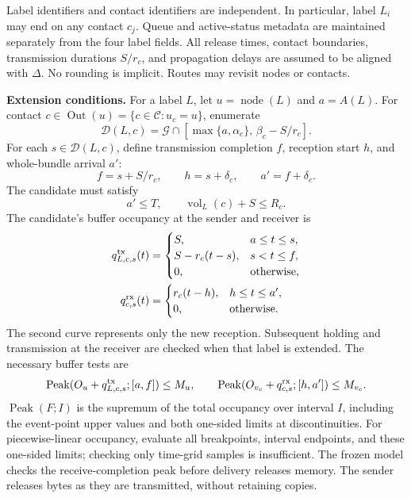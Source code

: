 \documentclass[10pt,a4paper]{article}
\newcommand{\grid}{\mathcal{G}}
\newcommand{\node}{\operatorname{node}}
\newcommand{\vol}{\operatorname{vol}}
\newcommand{\peak}{\operatorname{Peak}}
\newcommand{\out}{\operatorname{Out}}
\begin{document}
\medskip
Label identifiers and contact identifiers are independent. In particular, label $L_i$ may end on any contact $c_j$.
Queue and active-status metadata are maintained separately from the four label fields.
All release times, contact boundaries, transmission durations $S/r_c$, and propagation delays are assumed to be aligned with $\Delta$.
No rounding is implicit. Routes may revisit nodes or contacts.

\newpage
\noindent\textbf{Extension conditions.}
For a label $L$, let $u=\node(L)$ and $a=A(L)$. For contact $c\in\out(u)=\{c\in\mathcal C:u_c=u\}$, enumerate
\begin{equation}
\mathcal D(L,c)=\grid\cap
 [\max\{a,\alpha_c\},\,\beta_c-S/r_c].
\end{equation}
For each $s\in\mathcal D(L,c)$, define transmission completion $f$, reception start $h$, and whole-bundle arrival $a'$:
\begin{equation}
 f=s+S/r_c,\qquad h=s+\delta_c,\qquad a'=f+\delta_c.
\end{equation}
The candidate must satisfy
\begin{equation}
 a'\leq T,\qquad \vol_L(c)+S\leq R_c.
\end{equation}
The candidate's buffer occupancy at the sender and receiver is
\begin{align}
 q^{\rm tx}_{L,c,s}(t)&=
 \begin{cases}
 S,&a\leq t\leq s,\\
 S-r_c(t-s),&s<t\leq f,\\
 0,&\text{otherwise},
 \end{cases}\\
 q^{\rm rx}_{c,s}(t)&=
 \begin{cases}
 r_c(t-h),&h\leq t\leq a',\\
 0,&\text{otherwise}.
 \end{cases}
\end{align}
The second curve represents only the new reception. Subsequent holding and transmission at the receiver are checked when that label is extended.
The necessary buffer tests are
\begin{equation}
 \peak(O_u+q^{\rm tx}_{L,c,s};[a,f])\leq M_u,\qquad
 \peak(O_{v_c}+q^{\rm rx}_{c,s};[h,a'])\leq M_{v_c}.
\end{equation}
$\peak(F;I)$ is the supremum of the total occupancy over interval $I$, including the event-point upper values and both one-sided limits at discontinuities.
For piecewise-linear occupancy, evaluate all breakpoints, interval endpoints, and these one-sided limits; checking only time-grid samples is insufficient.
The frozen model checks the receive-completion peak before delivery releases memory. The sender releases bytes as they are transmitted, without retaining copies.
\end{document}
